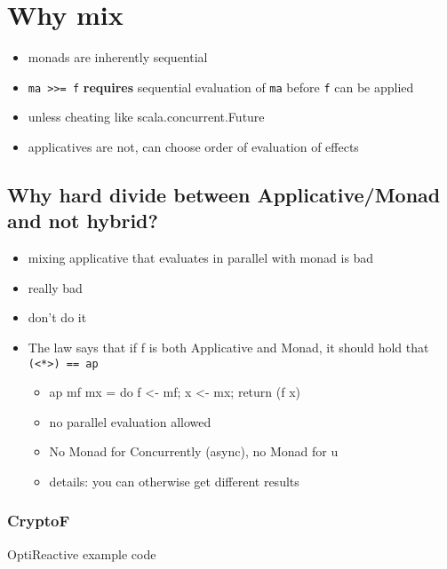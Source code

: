 \section{Why mix}
\label{sec:why-mix}

\begin{itemize}
\item monads are inherently sequential
\item \texttt{ma >>= f} \textbf{requires} sequential evaluation of \texttt{ma}
  before \texttt{f} can be applied
\item unless cheating like scala.concurrent.Future
\item applicatives are not, can choose order of evaluation of effects
\end{itemize}

\subsection{Why hard divide between Applicative/Monad and not hybrid?}
\label{sec:why-hard-divide}

\begin{itemize}
\item mixing applicative that evaluates in parallel with monad is bad
\item really bad
\item don't do it
\item The law says that if f is both Applicative and Monad, it should
  hold that \texttt{(<*>) == ap}
  \begin{itemize}
  \item ap mf mx = do f <- mf; x <- mx; return (f x)
  \item no parallel evaluation allowed
  \item No Monad for Concurrently (async), no Monad for u
  \item details: you can otherwise get different results
  \end{itemize}
\end{itemize}

\subsubsection{CryptoF}
\label{sec:cryptof}

\begin{listing}[htp]
  \caption{OptiReactive example code}
  \label{lst:optireactive-example-code}
\end{listing}


